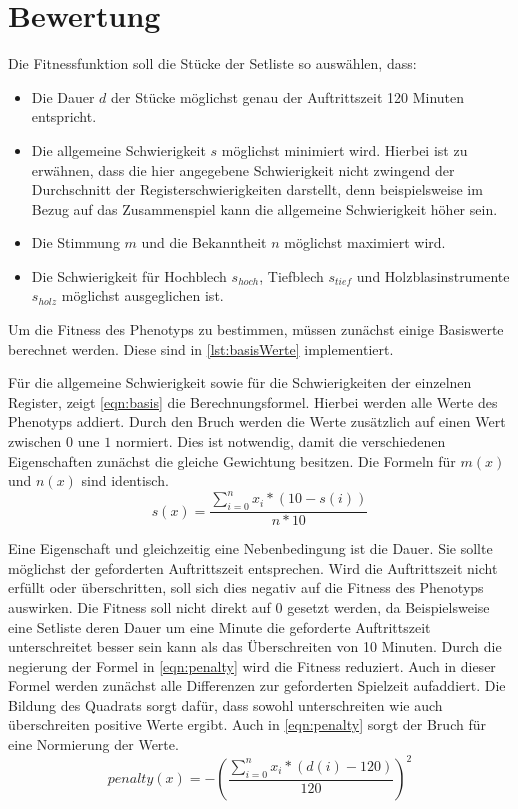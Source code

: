 \section{Bewertung}\label{sec:fitness}
Die Fitnessfunktion soll die Stücke der Setliste so auswählen, dass:
\begin{itemize}
    \item Die Dauer $d$ der Stücke möglichst genau der Auftrittszeit 120 Minuten entspricht.
    \item Die allgemeine Schwierigkeit $s$ möglichst minimiert wird. Hierbei ist zu erwähnen, dass die hier
        angegebene Schwierigkeit nicht zwingend der Durchschnitt der Registerschwierigkeiten darstellt, denn
        beispielsweise im Bezug auf das Zusammenspiel kann die allgemeine Schwierigkeit höher sein.
    \item Die Stimmung $m$ und die Bekanntheit $n$ möglichst maximiert wird.
    \item Die Schwierigkeit für Hochblech $s_{hoch}$, Tiefblech $s_{tief}$ und Holzblasinstrumente $s_{holz}$ möglichst ausgeglichen ist.
\end{itemize}
Um die Fitness des Phenotyps zu bestimmen, müssen zunächst einige Basiswerte berechnet werden. Diese sind in \autoref{lst:basisWerte} implementiert.

Für die allgemeine Schwierigkeit sowie für die Schwierigkeiten der einzelnen Register, zeigt \autoref{eqn:basis} die Berechnungsformel. Hierbei werden alle Werte des
Phenotyps addiert. Durch den Bruch werden die Werte zusätzlich auf einen Wert zwischen $0$ une $1$ normiert. Dies ist notwendig, 
damit die verschiedenen Eigenschaften zunächst die gleiche Gewichtung besitzen. 
Die Formeln für $m(x)$ und $n(x)$ sind identisch.
\begin{equation}
    s(x) = \frac{\sum_{i=0}^{n} x_i * (10 - s(i)) }{n * 10}
    \label{eqn:basis}
\end{equation}

Eine Eigenschaft und gleichzeitig eine Nebenbedingung ist die Dauer. Sie sollte möglichst der geforderten Auftrittszeit entsprechen. Wird die Auftrittszeit nicht erfüllt
oder überschritten, soll sich dies negativ auf die Fitness des Phenotyps auswirken. Die Fitness soll nicht direkt auf 0 gesetzt werden, da
Beispielsweise eine Setliste deren Dauer um eine Minute die geforderte Auftrittszeit unterschreitet besser sein kann als das Überschreiten von 10 Minuten.
Durch die negierung der Formel in \autoref{eqn:penalty} wird die Fitness reduziert. Auch in dieser Formel werden zunächst alle Differenzen zur geforderten
Spielzeit aufaddiert. Die Bildung des Quadrats sorgt dafür, dass sowohl unterschreiten wie auch überschreiten
positive Werte ergibt.
Auch in \autoref{eqn:penalty} sorgt der Bruch für eine Normierung der Werte.
\begin{equation}
    penalty(x) = -\left( \frac{\sum_{i=0}^{n}x_i * (d(i)-120)}{120}\right)^2
    \label{eqn:penalty}
\end{equation}

